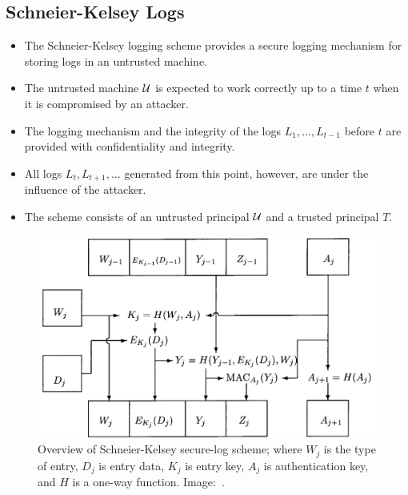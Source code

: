 \subsection{Schneier-Kelsey Logs}

\begin{frame}
  \begin{itemize}
    \item The Schneier-Kelsey logging scheme provides a secure logging 
      mechanism for storing logs in an untrusted machine.

    \item The untrusted machine \(\operatorname{\mathcal{U}}\) is expected to work correctly up to 
      a time \(t\) when it is compromised by an attacker.

    \item The logging mechanism and the integrity of the logs \(L_1, \ldots, 
      L_{t-1}\) before \(t\) are provided with confidentiality and integrity.

    \item All logs \(L_t, L_{t+1}, \ldots\) generated from this point, however, 
      are under the influence of the attacker.

  \end{itemize}
\end{frame}

\begin{frame}
  \begin{itemize}
    \item The scheme consists of an untrusted principal \(\operatorname{\mathcal{U}}\) and a trusted 
      principal \(T\).

  \end{itemize}
\end{frame}

\begin{frame}
  \begin{figure}
    \includegraphics[height=0.7\textheight]{seclog.png}
    \caption{%
      Overview of Schneier-Kelsey secure-log scheme; where \(W_j\) is the type 
      of entry, \(D_j\) is entry data, \(K_j\) is entry key, \(A_j\) is 
      authentication key, and \(H\) is a one-way function.
      Image:~\cite{schneier1999secure}.
    }
  \end{figure}
\end{frame}

